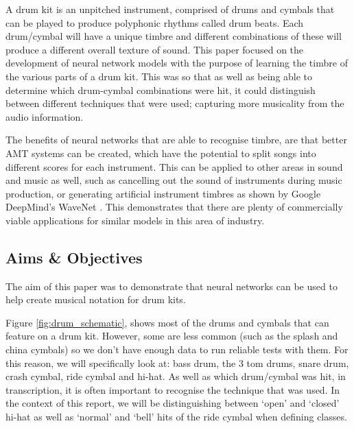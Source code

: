 \documentclass[12pt]{article}
\begin{document}
	A drum kit is an unpitched instrument, comprised of drums and cymbals that can be played to produce polyphonic rhythms called drum beats. Each drum/cymbal will have a unique timbre and different combinations of these will produce a different overall texture of sound. This paper focused on the development of neural network models with the purpose of learning the timbre of the various parts of a drum kit. This was so that as well as being able to determine which drum-cymbal combinations were hit, it could distinguish between different techniques that were used; capturing more musicality from the audio information.\medskip
	
	The benefits of neural networks that are able to recognise timbre, are that better AMT systems can be created, which have the potential to split songs into different scores for each instrument. This can be applied to other areas in sound and music as well, such as cancelling out the sound of instruments during music production, or generating artificial instrument timbres as shown by Google DeepMind's WaveNet \parencite{Oord2016}. This demonstrates that there are plenty of commercially viable applications for similar models in this area of industry.\medskip
	
	\newpage
	\subsection{Aims \& Objectives}
	\label{sec:aim_and_obj}
	The aim of this paper was to demonstrate that neural networks can be used to help create musical notation for drum kits. \medskip
	
	Figure \ref{fig:drum_schematic}, shows most of the drums and cymbals that can feature on a drum kit. However, some are less common (such as the splash and china cymbals) so we don't have enough data to run reliable tests with them. For this reason, we will specifically look at: bass drum, the 3 tom drums, snare drum, crash cymbal, ride cymbal and hi-hat. As well as which drum/cymbal was hit, in transcription, it is often important to recognise the technique that was used. In the context of this report, we will be distinguishing between `open' and `closed' hi-hat as well as `normal' and `bell' hits of the ride cymbal when defining classes.\medskip
	
\end{document}
